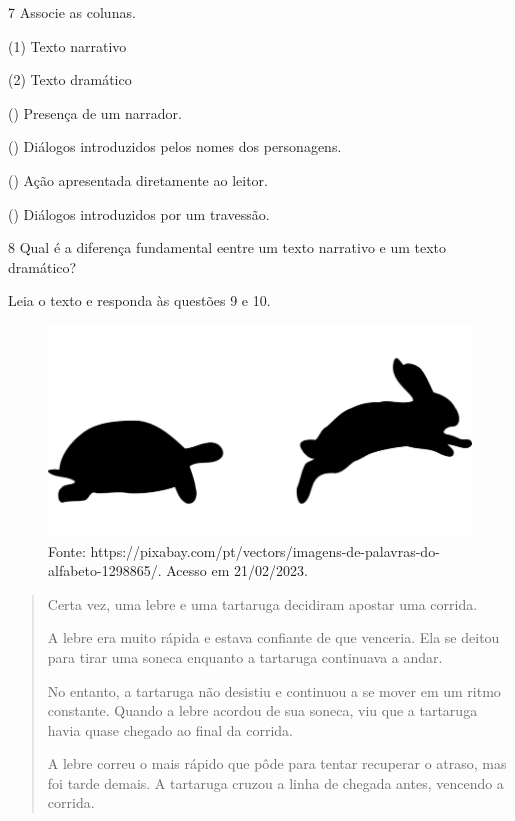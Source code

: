 
\num{7} Associe as colunas.

\begin{multicols}{2}
(1) Texto narrativo\medskip

(2) Texto dramático

\columnbreak

() Presença de um narrador.

() Diálogos introduzidos pelos nomes dos personagens.

() Ação apresentada diretamente ao leitor.

() Diálogos introduzidos por um travessão.
\end{multicols}

\num{8} Qual é a diferença fundamental eentre um texto narrativo e um texto dramático?



Leia o texto e responda às questões 9 e 10.

\begin{figure}[htpb!]
\includegraphics[width=.5\textwidth]{./imgs/img6.png}
\caption{Fonte: https://pixabay.com/pt/vectors/imagens-de-palavras-do-alfabeto-1298865/. Acesso em 21/02/2023.}
\end{figure}

\begin{quote}
Certa vez, uma lebre e uma tartaruga decidiram apostar uma corrida.

A lebre era muito rápida e estava confiante de que venceria. Ela se
deitou para tirar uma soneca enquanto a tartaruga continuava a andar.

No entanto, a tartaruga não desistiu e continuou a se mover em um ritmo
constante. Quando a lebre acordou de sua soneca, viu que a tartaruga
havia quase chegado ao final da corrida.

A lebre correu o mais rápido que pôde para tentar recuperar o atraso,
mas foi tarde demais. A tartaruga cruzou a linha de chegada antes,
vencendo a corrida.
\end{quote}

